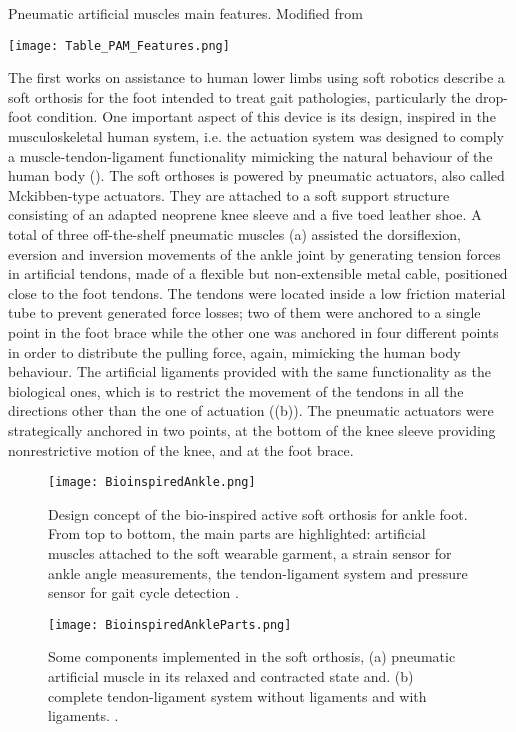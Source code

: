 \begin{table}[ht!]
  \caption{Pneumatic artificial muscles main features. Modified from \cite{Belforte2014}}
  \label{tbl:PMAs_feats}
  \centering
  \texttt{[image: Table\_PAM\_Features.png]}
\end{table}

The first works on assistance to human lower limbs using soft robotics \cite{park2011bio,Hamedi2015} describe a soft orthosis for the foot intended to treat gait pathologies, particularly the drop-foot condition. One important aspect of this device is its design, inspired in the musculoskeletal human system, i.e. the actuation system was designed to comply a muscle-tendon-ligament functionality mimicking the natural behaviour of the human body (). The soft orthoses is powered by pneumatic actuators, also called Mckibben-type actuators. They are attached to a soft support structure consisting of an adapted neoprene knee sleeve and a five toed leather shoe. A total of three off-the-shelf pneumatic muscles (a) assisted the dorsiflexion, eversion and inversion movements of the ankle joint by generating tension forces in artificial tendons, made of a flexible but non-extensible metal cable, positioned close to the foot tendons. The tendons were located inside a low friction material tube to prevent generated force losses; two of them were anchored to a single point in the foot brace while the other one was anchored in four different points in order to distribute the pulling force, again, mimicking the human body behaviour. The artificial ligaments provided with the same functionality as the biological ones, which is to restrict the movement of the tendons in all the directions other than the one of actuation ((b)). The pneumatic actuators were strategically anchored in two points, at the bottom of the knee sleeve providing nonrestrictive motion of the knee, and at the foot brace.
\begin{figure}[hbt!]
    \centering
    \texttt{[image: BioinspiredAnkle.png]}
    \caption{Design concept of the bio-inspired active soft orthosis for ankle foot. From top to bottom, the main parts are highlighted: artificial muscles attached to the soft wearable garment, a strain sensor for ankle angle measurements, the tendon-ligament system and pressure sensor for gait cycle detection \cite{park2011bio}. }
    \label{fig:bio_ankle}
\end{figure}
\begin{figure}[hbt!]
    \centering
    \texttt{[image: BioinspiredAnkleParts.png]}
    \caption{Some components implemented in the soft orthosis, (a) pneumatic artificial muscle in its relaxed and contracted state and. (b) complete tendon-ligament system without ligaments and with ligaments. \cite{park2011bio}. }
    \label{fig:bio_ankle_parts}
\end{figure}

